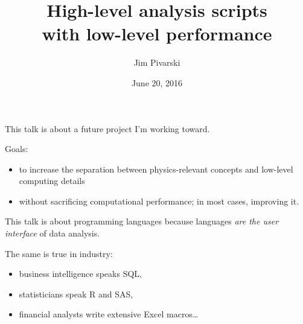 \documentclass{beamer}
\title[2016-06-20-high-level-low-level]{High-level analysis scripts \\ with low-level performance}
\author{Jim Pivarski}
\institute{Princeton University -- DIANA}
\date{June 20, 2016}
\begin{document}

\begin{frame}
  \titlepage
\end{frame}



\begin{frame}{}
\vfill
This talk is about a future project I'm working toward.

\vfill
\begin{block}{Goals:}
\begin{itemize}
\item to increase the separation between physics-relevant concepts and low-level computing details
\item without sacrificing computational performance; in most cases, improving it.
\end{itemize}
\end{block}
\end{frame}

\begin{frame}{}
\vfill
This talk is about programming languages because languages {\it are the user interface} of data analysis.

\vfill
The same is true in industry:
\begin{itemize}
\item business intelligence speaks SQL,
\item statisticians speak R and SAS,
\item financial analysts write extensive Excel macros\ldots
\end{itemize}
\end{frame}
\end{document}
